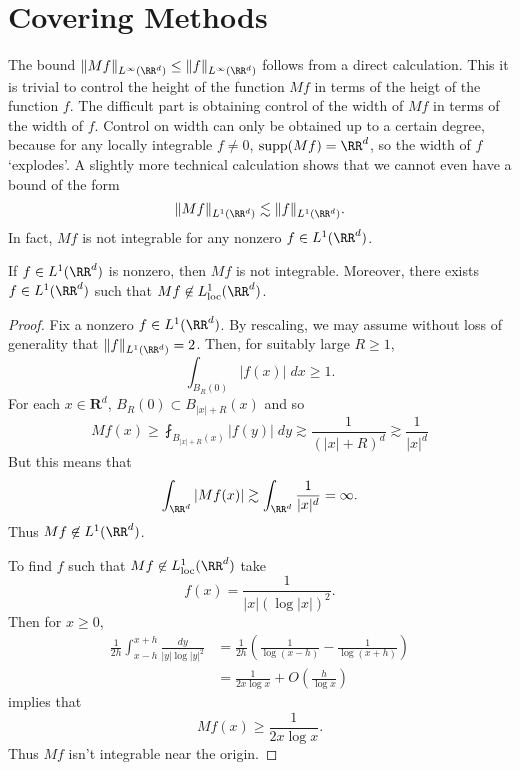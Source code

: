 \section{Covering Methods}

The bound $\| Mf \|_{L^\infty(\RR^d)} \leq \| f \|_{L^\infty(\RR^d)}$ follows from a direct calculation. This it is trivial to control the height of the function $Mf$ in terms of the heigt of the function $f$. The difficult part is obtaining control of the width of $Mf$ in terms of the width of $f$. Control on width can only be obtained up to a certain degree, because for any locally integrable $f \neq 0$, $\text{supp}(Mf) = \RR^d$, so the width of $f$ `explodes'. A slightly more technical calculation shows that we cannot even have a bound of the form
%
\[ \| Mf \|_{L^1(\RR^d)} \lesssim \| f \|_{L^1(\RR^d)}. \]
%
In fact, $Mf$ is not integrable for any nonzero $f \in L^1(\RR^d)$.

\begin{lemma}
    If $f \in L^1(\RR^d)$ is nonzero, then $Mf$ is not integrable. Moreover, there exists $f \in L^1(\RR^d)$ such that $Mf \not \in L^1_{\text{loc}}(\RR^d)$.
\end{lemma}
\begin{proof}
    Fix a nonzero $f \in L^1(\RR^d)$. By rescaling, we may assume without loss of generality that $\| f \|_{L^1(\RR^d)} = 2$. Then, for suitably large $R \geq 1$,
    \[ \int_{B_R(0)} |f(x)|\; dx \geq 1. \]
    For each $x \in \mathbf{R}^d$, $B_R(0) \subset B_{|x|+R}(x)$ and so
    \[ Mf(x) \geq \fint_{B_{|x|+R}(x)} |f(y)|\; dy \gtrsim \frac{1}{(|x| + R)^d} \gtrsim \frac{1}{|x|^d} \]
    But this means that
    \[ \int_{\RR^d} |Mf(x)| \gtrsim \int_{\RR^d} \frac{1}{|x|^d} = \infty. \]
    Thus $Mf \not \in L^1(\RR^d)$.

    To find $f$ such that $Mf \not \in L^1_{\text{loc}}(\RR^d)$ take
    \[ f(x) = \frac{1}{|x| (\log |x|)^2}. \]
    Then for $x \geq 0$,
    \begin{align*}
        \frac{1}{2h} \int_{x-h}^{x+h} \frac{dy}{|y| \log |y|^2} &= \frac{1}{2h} \left( \frac{1}{\log(x-h)} - \frac{1}{\log(x+h)} \right)\\
        &= \frac{1}{2x \log x} + O \left( \frac{h}{\log x} \right)
    \end{align*}
    implies that
    \[ Mf(x) \geq \frac{1}{2x \log x}. \]
    Thus $Mf$ isn't integrable near the origin.
\end{proof}

